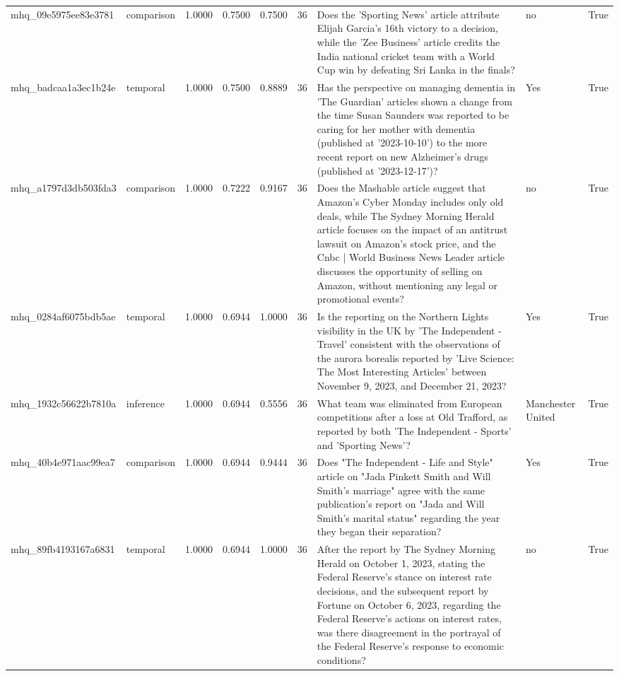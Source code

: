 \begin{tabular}{llrrrrllr}
mhq_09e5975ee83e3781 & comparison & 1.0000 & 0.7500 & 0.7500 & 36 & Does the 'Sporting News' article attribute Elijah Garcia's 16th victory to a decision, while the 'Zee Business' article credits the India national cricket team with a World Cup win by defeating Sri Lanka in the finals? & no & True \\
mhq_badcaa1a3ec1b24e & temporal & 1.0000 & 0.7500 & 0.8889 & 36 & Has the perspective on managing dementia in 'The Guardian' articles shown a change from the time Susan Saunders was reported to be caring for her mother with dementia (published at '2023-10-10') to the more recent report on new Alzheimer’s drugs (published at '2023-12-17')? & Yes & True \\
mhq_a1797d3db503fda3 & comparison & 1.0000 & 0.7222 & 0.9167 & 36 & Does the Mashable article suggest that Amazon's Cyber Monday includes only old deals, while The Sydney Morning Herald article focuses on the impact of an antitrust lawsuit on Amazon's stock price, and the Cnbc | World Business News Leader article discusses the opportunity of selling on Amazon, without mentioning any legal or promotional events? & no & True \\
mhq_0284af6075bdb5ae & temporal & 1.0000 & 0.6944 & 1.0000 & 36 & Is the reporting on the Northern Lights visibility in the UK by 'The Independent - Travel' consistent with the observations of the aurora borealis reported by 'Live Science: The Most Interesting Articles' between November 9, 2023, and December 21, 2023? & Yes & True \\
mhq_1932c56622b7810a & inference & 1.0000 & 0.6944 & 0.5556 & 36 & What team was eliminated from European competitions after a loss at Old Trafford, as reported by both 'The Independent - Sports' and 'Sporting News'? & Manchester United & True \\
mhq_40b4e971aac99ea7 & comparison & 1.0000 & 0.6944 & 0.9444 & 36 & Does "The Independent - Life and Style" article on "Jada Pinkett Smith and Will Smith's marriage" agree with the same publication's report on "Jada and Will Smith's marital status" regarding the year they began their separation? & Yes & True \\
mhq_89fb4193167a6831 & temporal & 1.0000 & 0.6944 & 1.0000 & 36 & After the report by The Sydney Morning Herald on October 1, 2023, stating the Federal Reserve's stance on interest rate decisions, and the subsequent report by Fortune on October 6, 2023, regarding the Federal Reserve's actions on interest rates, was there disagreement in the portrayal of the Federal Reserve's response to economic conditions? & no & True \\

\end{tabular}
